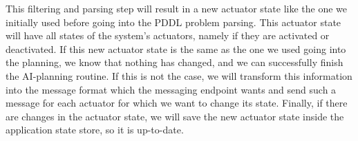 This filtering and parsing step will result in a new actuator state like the one we initially used before going into the PDDL problem parsing.
This actuator state will have all states of the system's actuators, namely if they are activated or deactivated.
If this new actuator state is the same as the one we used going into the planning, we know that nothing has changed, and we can successfully finish the AI-planning routine.
If this is not the case, we will transform this information into the message format which the messaging endpoint wants and send such a message for each actuator for which we want to change its state.
Finally, if there are changes in the actuator state, we will save the new actuator state inside the application state store, so it is up-to-date.
